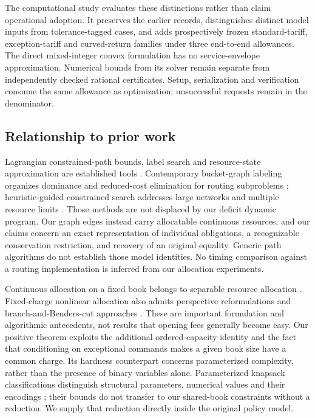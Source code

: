 \documentclass[11pt,letterpaper]{article}
\theoremstyle{definition}\newtheorem{remark}[theorem]{Remark}
\begin{document}
The computational study evaluates these distinctions rather than claim operational adoption. It preserves the earlier records, distinguishes distinct model inputs from tolerance-tagged cases, and adds prospectively frozen standard-tariff, exception-tariff and curved-return families under three end-to-end allowances. The direct mixed-integer convex formulation has no service-envelope approximation. Numerical bounds from its solver remain separate from independently checked rational certificates. Setup, serialization and verification consume the same allowance as optimization; unsuccessful requests remain in the denominator.

\subsection{Relationship to prior work}
Lagrangian constrained-path bounds, label search and resource-state approximation are established tools \citep{HandlerZang1980,BeasleyChristofides1989,Fisher1981,Hassin1992,LorenzRaz2001,PuglieseGuerriero2013}. Contemporary bucket-graph labeling organizes dominance and reduced-cost elimination for routing subproblems \citep{Sadykov2021}; heuristic-guided constrained search addresses large networks and multiple resource limits \citep{Ahmadi2025}. Those methods are not displaced by our deficit dynamic program. Our graph edges instead carry allocatable continuous resources, and our claims concern an exact representation of individual obligations, a recognizable conservation restriction, and recovery of an original equality. Generic path algorithms do not establish those model identities. No timing comparison against a routing implementation is inferred from our allocation experiments.

Continuous allocation on a fixed book belongs to separable resource allocation \citep{Patriksson2008}. Fixed-charge nonlinear allocation also admits perspective reformulations and branch-and-Benders-cut approaches \citep{Yang2025}. These are important formulation and algorithmic antecedents, not results that opening fees generally become easy. Our positive theorem exploits the additional ordered-capacity identity and the fact that conditioning on exceptional commands makes a given book size have a common charge. Its hardness counterpart concerns parameterized complexity, rather than the presence of binary variables alone. Parameterized knapsack classifications distinguish structural parameters, numerical values and their encodings \citep{Gurski2019}; their bounds do not transfer to our shared-book constraints without a reduction. We supply that reduction directly inside the original policy model.
\end{document}
